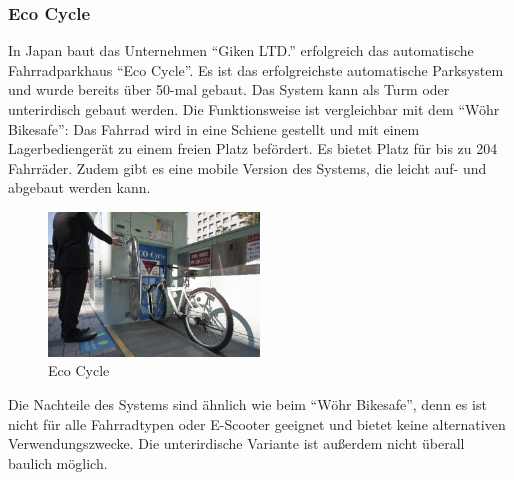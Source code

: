\subsubsection{Eco Cycle}
In Japan baut das Unternehmen \enquote{Giken LTD.} erfolgreich das automatische Fahrradparkhaus \enquote{Eco Cycle}. Es ist das erfolgreichste automatische Parksystem und wurde bereits über 50-mal gebaut.  Das System kann als Turm oder unterirdisch gebaut werden. Die Funktionsweise ist vergleichbar mit dem \enquote{Wöhr Bikesafe}: Das Fahrrad wird in eine Schiene gestellt und mit einem Lagerbediengerät zu einem freien Platz befördert. Es bietet Platz für bis zu 204 Fahrräder.\cite*{ecocycle} Zudem gibt es eine mobile Version des Systems, die leicht auf- und abgebaut werden kann.\cite*{ecocyclemobile}

\begin{figure}[H]
    \centering
    \includegraphics[width=0.5\textwidth]{images/ecocycle.jpg}
    \caption{Eco Cycle }
    \label{fig:ecocycle}
\end{figure}

Die Nachteile des Systems sind ähnlich wie beim \enquote{Wöhr Bikesafe}, denn es ist nicht für alle Fahrradtypen oder E-Scooter geeignet und bietet keine alternativen Verwendungszwecke. Die unterirdische Variante ist außerdem nicht überall baulich möglich.